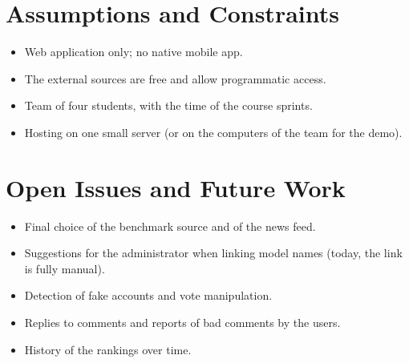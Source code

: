 \documentclass[11pt,a4paper]{article}
\begin{document}
\section{Assumptions and Constraints}

\begin{itemize}
  \item Web application only; no native mobile app.
  \item The external sources are free and allow programmatic access.
  \item Team of four students, with the time of the course sprints.
  \item Hosting on one small server (or on the computers of the team for the demo).
\end{itemize}

\section{Open Issues and Future Work}

\begin{itemize}
  \item Final choice of the benchmark source and of the news feed.
  \item Suggestions for the administrator when linking model names (today, the link is fully manual).
  \item Detection of fake accounts and vote manipulation.
  \item Replies to comments and reports of bad comments by the users.
  \item History of the rankings over time.
\end{itemize}
\end{document}
